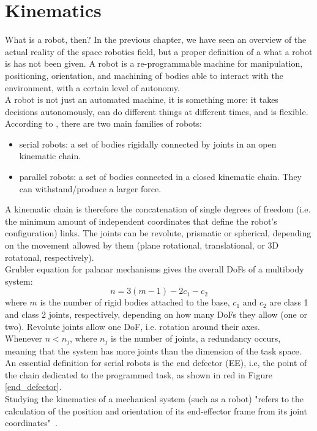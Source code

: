 \documentclass[a4paper,12pt,oneside]{report}
\begin{document}
\chapter{Kinematics}\label{kinematics}
What is a robot, then? In the previous chapter, we have seen an overview of the actual reality of the space robotics field, but a proper definition of a what a robot is has not been given. A robot is a re-programmable machine for manipulation, positioning, orientation, and machining of bodies able to interact with the environment, with a certain level of autonomy.\\
A robot is not just an automated machine, it is something more: it takes decisions autonomously, can do different things at different times, and is flexible.\\
According to \cite{eleven}, there are two main families of robots:
\begin{itemize}
  \item serial robots: a set of bodies rigidally connected by joints in an open kinematic chain.
  \item parallel robots: a set of bodies connected in a closed kinematic chain. They can withstand/produce a larger force.
\end{itemize}
A kinematic chain is therefore the concatenation of single degrees of freedom (i.e. the minimum amount of independent coordinates that define the robot's configuration) links. The joints can be revolute, prismatic or spherical, depending on the movement allowed by them (plane rotational, translational, or 3D rotatonal, respectively).\\
Grubler equation for palanar mechanisms gives the overall DoFs of a multibody system:
\begin{equation}
  n = 3(m-1)-2c_1-c_2
  \label{grubler}
\end{equation}
where $m$ is the number of rigid bodies attached to the base, $c_1$ and $c_2$ are class 1 and class 2 joints, respectively, depending on how many DoFs they allow (one or two). Revolute joints allow one DoF, i.e. rotation around their axes.\\
Whenever $n<n_j$, where $n_j$ is the number of joints, a redundancy occurs, meaning that the system has more joints than the dimension of the task space.\\
An essential definition for serial robots is the end defector (EE), i.e, the point of the chain dedicated to the programmed task, as shown in red in Figure \ref{end_defector}.\\
Studying the kinematics of a mechanical system (such as a robot) "refers to the calculation of the position and orientation of its end-eﬀector frame from its joint coordinates"~\cite{eleven}.\\
\end{document}
